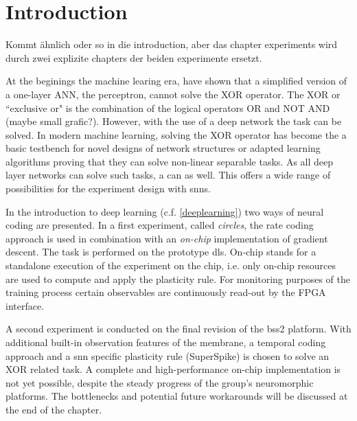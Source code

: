 \chapter{Introduction}

Kommt ähnlich oder so in die introduction, aber das chapter experiments wird durch zwei explizite chapters der beiden experimente ersetzt.


At the beginings the machine learing era, \cite{perceptron} have shown that a simplified version of a one-layer ANN, the perceptron, cannot solve the XOR operator. The XOR or ``exclusive or" is the combination of the logical operators OR and NOT AND (maybe small grafic?). However, with the use of a deep network the task can be solved. In modern machine learning, solving the XOR operator has become the a basic testbench for novel designs of network structures or adapted learning algorithms proving that they can solve non-linear separable tasks. As all deep layer networks can solve such tasks, a  can as well. This offers a wide range of possibilities for the experiment design with \glspl{snn}.

In the introduction to deep learning (c.f. \ref{deeplearning}) two ways of neural coding are presented. In a first experiment, called \textit{circles}, the rate coding approach is used in combination with an \textit{on-chip} implementation of gradient descent. The task is performed on the prototype \gls{dls}. On-chip stands for a standalone execution of the experiment on the chip, i.e. only on-chip resources are used to compute and apply the plasticity rule. For monitoring purposes of the training process certain observables are continuously read-out by the FPGA interface.

A second experiment is conducted on the final revision of the \gls{bss2} platform. With additional built-in observation features of the membrane, a temporal coding approach and a \gls{snn} specific plasticity rule (SuperSpike) is chosen to solve an XOR related task. A complete and high-performance on-chip implementation is not yet possible, despite the steady progress of the group's neuromorphic platforms. The bottlenecks and potential future workarounds will be discussed at the end of the chapter.\\